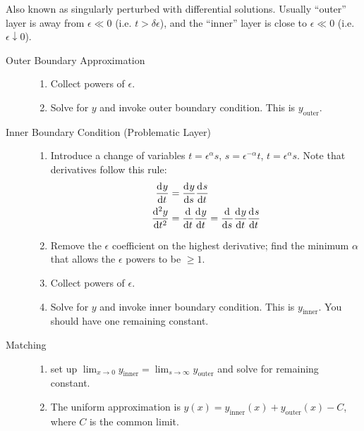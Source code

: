 \item[Boundary Layers] Also known as singularly perturbed with differential
  solutions. Usually ``outer'' layer is away from $\epsilon\ll0$ (i.e.
  $t>\delta\epsilon$), and the ``inner'' layer is close to $\epsilon\ll0$ (i.e.
  $\epsilon\downarrow0$).
  \begin{description}
  \item [Outer Boundary Approximation] \hfill
    \begin{enumerate}
    \item Collect powers of $\epsilon$.
    \item Solve for $y$ and invoke outer boundary condition. This is
      $y_{\text{outer}}$.
    \end{enumerate}
  \item[Inner Boundary Condition (Problematic Layer)] \hfill
    \begin{enumerate}
    \item Introduce a change of variables $t=\epsilon^{\alpha}s$,
      $s=\epsilon^{-\alpha}t$, $t=\epsilon^{\alpha}s$. Note that derivatives
      follow this rule:
      \begin{align*}
        \od{y}{t} &= \od{y}{s}\od{s}{t} \\
        \od[2]{y}{t} &= \od{}{t}\od{y}{t} = \od{}{s}\od{y}{t}\od{s}{t}
      \end{align*}
    \item Remove the $\epsilon$ coefficient on the highest derivative; find the
      minimum $\alpha$ that allows the $\epsilon$ powers to be $\ge1$.
    \item Collect powers of $\epsilon$.
    \item Solve for $y$ and invoke inner boundary condition. This is
      $y_{\text{inner}}$. You should have one remaining constant.
    \end{enumerate}
  \item[Matching] \hfill
    \begin{enumerate}
    \item set up
      $\lim_{x\rightarrow0}y_{\text{inner}}=\lim_{s\rightarrow\infty}y_{\text{outer}}$
      and solve for remaining constant.
    \item The uniform approximation is $y(x)=y_{\text{inner}}(x) +
      y_{\text{outer}}(x)-C$, where $C$ is the common limit.
    \end{enumerate}
  \end{description}

